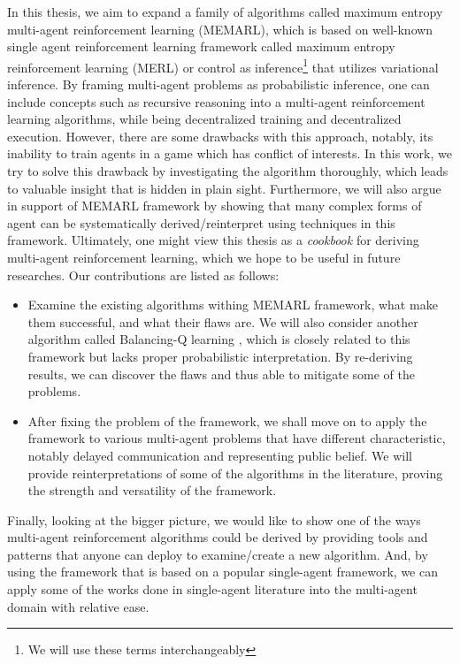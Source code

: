 In this thesis, we aim to expand a family of algorithms called maximum entropy multi-agent reinforcement learning (MEMARL), which is based on well-known single agent reinforcement learning framework called maximum entropy reinforcement learning (MERL) or control as inference\footnote{We will use these terms interchangeably} that utilizes variational inference. By framing multi-agent problems as probabilistic inference, one can include concepts such as recursive reasoning \cite{wen2019probabilistic, wen2019multi} into a multi-agent reinforcement learning algorithms, while being decentralized training and decentralized execution. However, there are some drawbacks with this approach, notably, its inability to train agents in a game which has conflict of interests. In this work, we try to solve this drawback by investigating the algorithm thoroughly, which leads to valuable insight that is hidden in plain sight. Furthermore, we will also argue in support of MEMARL framework by showing that many complex forms of agent can be systematically derived/reinterpret using techniques in this framework. Ultimately, one might view this thesis as a \textit{cookbook} for deriving multi-agent reinforcement learning, which we hope to be useful in future researches. Our contributions are listed as follows:
\begin{itemize}
    \item Examine the existing algorithms withing MEMARL framework, what make them successful, and what their flaws are. We will also consider another algorithm called Balancing-Q learning \cite{grau2018balancing}, which is closely related to this framework but lacks proper probabilistic interpretation. By re-deriving results, we can discover the flaws and thus able to mitigate some of the problems. 
    \item After fixing the problem of the framework, we shall move on to apply the framework to various multi-agent problems that have different characteristic, notably delayed communication and representing public belief. We will provide reinterpretations of some of the algorithms in the literature, proving the strength and versatility of the framework.
\end{itemize}
Finally, looking at the bigger picture, we would like to show one of the ways multi-agent reinforcement algorithms could be derived by providing tools and patterns that anyone can deploy to examine/create a new algorithm. And, by using the framework that is based on a popular single-agent framework, we can apply some of the works done in single-agent literature into the multi-agent domain with relative ease. 